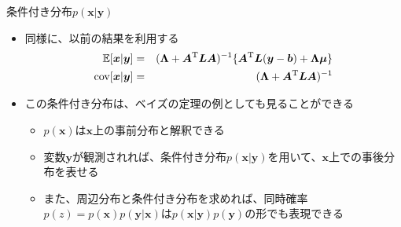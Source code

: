 \begin{frame}{条件付き分布$p(\bm{x}|\bm{y})$}
 \begin{itemize}
  \item 同様に、以前の結果を利用する
        \begin{eqnarray}
         \mathbb{E}[\bm{x}|\bm{y}]& =& (\bm{\Lambda}+\bm{A}^{\mathrm{T}}\bm{L}\bm{A})^{-1}\{\bm{A}^{\mathrm{T}}\bm{L}(\bm{y}-\bm{b})+\bm{\Lambda}\bm{\mu}\}\\
         {\rm cov}[\bm{x}|\bm{y}] &= & (\bm{\Lambda}+\bm{A}^{\mathrm{T}}\bm{L}\bm{A})^{-1}
        \end{eqnarray}
  \item この条件付き分布は、ベイズの定理の例としても見ることができる
        \begin{itemize}
         \item $p(\bm{x})$は$\bm{x}$上の事前分布と解釈できる
         \item 変数$\bm{y}$が観測されれば、条件付き分布$p(\bm{x}|\bm{y})$を用いて、$\bm{x}$上での事後分布を表せる
         \item また、周辺分布と条件付き分布を求めれば、同時確率$p(z)=p(\bm{x})p(\bm{y}|\bm{x})$は$p(\bm{x}|\bm{y})p(\bm{y})$の形でも表現できる
        \end{itemize}
 \end{itemize}

\end{frame}
